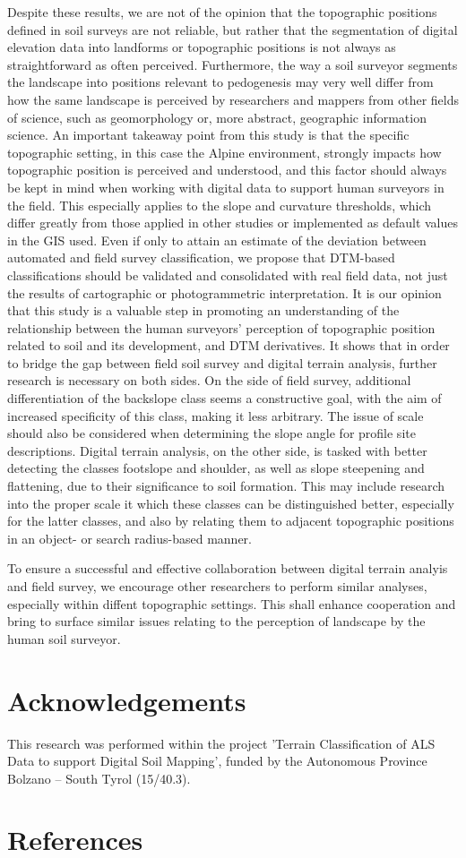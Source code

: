 \documentclass[preprint,12pt,authoryear]{elsarticle}
\begin{document}
Despite these results, we are not of the opinion that the topographic positions defined in  soil surveys are not reliable, but rather that the segmentation of digital elevation data into landforms or topographic positions is not always as straightforward as often perceived. Furthermore, the way a soil surveyor segments the landscape into positions relevant to pedogenesis may very well differ from how the same landscape is perceived by researchers and mappers from other fields of science, such as geomorphology or, more abstract, geographic information science. An important takeaway point from this study is that the specific topographic setting, in this case the Alpine environment, strongly impacts how topographic position is perceived and understood, and this factor should always be kept in mind when working with digital data to support human surveyors in the field. This especially applies to the slope and curvature thresholds, which differ greatly from those applied in other studies or implemented as default values in the GIS used. Even if only to attain an estimate of the deviation between automated and field survey classification, we propose that DTM-based classifications should be validated and consolidated with real field data, not just the results of cartographic or photogrammetric interpretation. It is our opinion that this study is a valuable step in promoting an understanding of the relationship between the human surveyors' perception of topographic position related to soil and its development, and DTM derivatives.
It shows that in order to bridge the gap between field soil survey and digital terrain analysis, further research is necessary on both sides. On the side of field survey, additional differentiation of the backslope class seems a constructive goal, with the aim of increased specificity of this class, making it less arbitrary. The issue of scale should also be considered when determining the slope angle for profile site descriptions. Digital terrain analysis, on the other side, is tasked with better detecting the classes footslope and shoulder, as well as slope steepening and flattening, due to their significance to soil formation. This may include research into the proper scale it which these classes can be distinguished better, especially for the latter classes, and also by relating them to adjacent topographic positions in an object- or search radius-based manner.

To ensure a successful and effective collaboration between digital terrain analyis and field survey, we encourage other researchers to perform similar analyses, especially within diffent topographic settings. This shall enhance cooperation and bring to surface similar issues relating to the perception of landscape by the human soil surveyor.

\section*{Acknowledgements} This research was performed within the project 'Terrain Classification of ALS Data to support Digital Soil Mapping', funded by the Autonomous Province Bolzano -- South Tyrol (15/40.3).
\section*{References}

\end{document}
